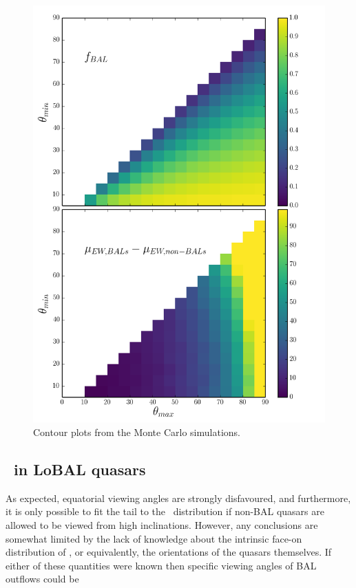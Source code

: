 \begin{figure} %
\centering
\includegraphics[width=1.0\textwidth]{figures/ewpaper/faceon_ew_c4_faceon_sdss.png}
\caption
{
Contour plots from the Monte Carlo simulations.
}
\label{fig:c4_faceon}
\end{figure} %






\subsection{\ewo\ in LoBAL quasars}




As expected, equatorial viewing angles are strongly 
disfavoured, and furthermore, it is only possible to fit
the tail to the \ewo\ distribution if non-BAL quasars are allowed 
to be viewed from high inclinations. However, any conclusions
are somewhat limited by the lack of knowledge about the 
intrinsic face-on distribution of \ewo, or equivalently,
the orientations of the quasars themselves. If either of these
quantities were known then specific viewing angles of
BAL outflows could be 


